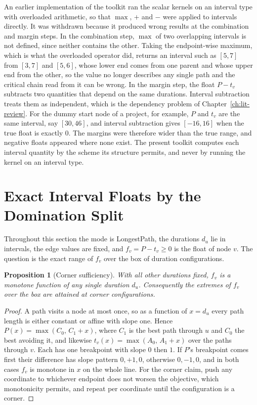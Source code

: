 \documentclass[12pt]{report}
\newtheorem{proposition}[theorem]{Proposition}
\begin{document}
An earlier implementation of the toolkit ran the scalar kernels on an interval type with
overloaded arithmetic, so that $\max$, $+$ and $-$ were applied to intervals directly. It
was withdrawn because it produced wrong results at the combination and margin steps. In
the combination step,
$\max$ of two overlapping intervals is not defined, since neither contains the other.
Taking the endpoint-wise maximum, which is what the overloaded operator did, returns an
interval such as $[5, 7]$ from $[3, 7]$ and $[5, 6]$, whose lower end comes from one
parent and whose upper end from the other, so the value no longer describes any single
path and the critical chain read from it can be wrong. In the margin step, the float
$P - t_v$ subtracts two quantities that depend on the same durations. Interval
subtraction treats them as independent, which is the dependency problem of
Chapter~\ref{ch:lit-review}. For the dummy start node of a project, for example, $P$ and
$t_v$ are the same interval, say $[30, 46]$, and interval subtraction gives
$[-16, 16]$ when the true float is exactly $0$. The margins were therefore wider than
the true range, and negative floats appeared where none exist. The present toolkit
computes each interval quantity by the scheme its structure permits, and never by
running the kernel on an interval type.

\section{Exact Interval Floats by the Domination Split}
\label{sec:cpm-split}

Throughout this section the mode is LongestPath, the durations $d_u$ lie in intervals,
the edge values are fixed, and $f_v = P - t_v \ge 0$ is the float of node $v$. The
question is the exact range of $f_v$ over the box of duration configurations.

\begin{proposition}[Corner sufficiency]
\label{prop:cpm-corner}
With all other durations fixed, $f_v$ is a monotone function of any single duration
$d_u$. Consequently the extremes of $f_v$ over the box are attained at corner
configurations.
\end{proposition}

\begin{proof}
A path visits a node at most once, so as a function of $x = d_u$ every path length is
either constant or affine with slope one. Hence $P(x) = \max(C_0,\, C_1 + x)$, where $C_1$
is the best path through $u$ and $C_0$ the best avoiding it, and likewise
$t_v(x) = \max(A_0,\, A_1 + x)$ over the paths through $v$. Each has one breakpoint with
slope $0$ then $1$. If $P$'s breakpoint comes first their difference has slope pattern
$0, +1, 0$, otherwise $0, -1, 0$, and in both cases $f_v$ is monotone in $x$ on the whole
line. For the corner claim, push any coordinate to whichever endpoint does not worsen the
objective, which monotonicity permits, and repeat per coordinate until the configuration
is a corner.
\end{proof}
\end{document}
